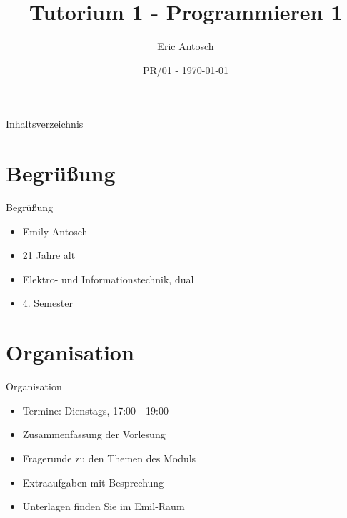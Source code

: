 \documentclass[usenames,dvipsnames,10pt]{beamer}
\title{Tutorium 1 - Programmieren 1}
\date[ISPN ’80]{PR/01 - \today}
\author{Eric Antosch}
\begin{document}
    
    \begin{frame}
        \titlepage
    \end{frame}    
    \begin{frame}{Inhaltsverzeichnis}
        \tableofcontents
    \end{frame}
    \section{Begrüßung}
    \begin{frame}{Begrüßung}
        \begin{itemize}
            \item Emily Antosch
            \pause
            \item 21 Jahre alt
            \pause 
            \item Elektro- und Informationstechnik, dual
            \pause
            \item 4. Semester
        \end{itemize}
    \end{frame}
    \section{Organisation}
    \begin{frame}{Organisation}
        \begin{itemize}
            \item Termine: Dienstags, 17:00 - 19:00
            \item Zusammenfassung der Vorlesung
            \item Fragerunde zu den Themen des Moduls
            \item Extraaufgaben mit Besprechung
            \item Unterlagen finden Sie im Emil-Raum
        \end{itemize}
    \end{frame}
\end{document}
